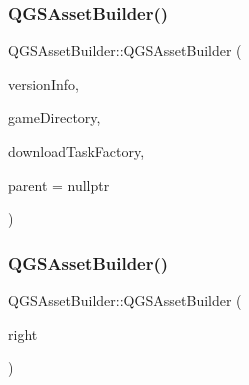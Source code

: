 \subsubsection{\texorpdfstring{Q\+G\+S\+Asset\+Builder()}{QGSAssetBuilder()}\hspace{0.1cm}{\footnotesize\ttfamily [1/3]}}
{\footnotesize\ttfamily Q\+G\+S\+Asset\+Builder\+::\+Q\+G\+S\+Asset\+Builder (\begin{DoxyParamCaption}\item[{\mbox{\hyperlink{class_q_g_s_game_version_info}{Q\+G\+S\+Game\+Version\+Info}} \&}]{version\+Info,  }\item[{\mbox{\hyperlink{class_q_g_s_game_directory}{Q\+G\+S\+Game\+Directory}} $\ast$}]{game\+Directory,  }\item[{\mbox{\hyperlink{class_q_g_s_download_task_factory}{Q\+G\+S\+Download\+Task\+Factory}} $\ast$}]{download\+Task\+Factory,  }\item[{Q\+Object $\ast$}]{parent = {\ttfamily nullptr} }\end{DoxyParamCaption})}

\mbox{\label{class_q_g_s_asset_builder_acfd4824607044d785d5b8b2f5e7189ed}} 
\subsubsection{\texorpdfstring{Q\+G\+S\+Asset\+Builder()}{QGSAssetBuilder()}\hspace{0.1cm}{\footnotesize\ttfamily [2/3]}}
{\footnotesize\ttfamily Q\+G\+S\+Asset\+Builder\+::\+Q\+G\+S\+Asset\+Builder (\begin{DoxyParamCaption}\item[{const \mbox{\hyperlink{class_q_g_s_asset_builder}{Q\+G\+S\+Asset\+Builder}} \&}]{right }\end{DoxyParamCaption})\hspace{0.3cm}{\ttfamily [delete]}}

\mbox{\label{class_q_g_s_asset_builder_a77fc891c54c327a3305ea12272aad6d9}} 
